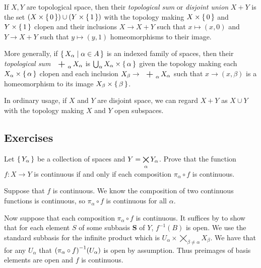 \documentclass[letterpaper, 11pt, oneside]{book}
\begin{document}
\clearpage

\begin{defn}
  If $X, Y$ are topological space, then their \emph{topological sum} or \emph{disjoint union} $X + Y$ is the set $(X \times \set{0}) \cup (Y \times \set{1})$ with the topology making $X \times \set{0}$ and $Y \times \set{1}$ clopen and their inclusions $X \to X + Y$ such that $x \mapsto (x, 0)$ and $Y \to X + Y$ such that $y \mapsto (y, 1)$ homeomorphisms to their image.

  More generally, if $\set{X_{\alpha} | \alpha \in A}$ is an indexed family of spaces, then their \emph{topological sum} $\bigplus_{\alpha} X_{\alpha}$ is $\bigcup_{\alpha} X_{\alpha} \times \set{\alpha}$ given the topology making each $X_{\alpha} \times \set{\alpha}$ clopen and each inclusion $X_{\beta} \to \bigplus_{\alpha} X_{\alpha}$ such that $x \to (x, \beta)$ is a homeomorphism to its image $X_{\beta} \times \set{\beta}$.
\end{defn}

In ordinary usage, if $X$ and $Y$ are disjoint space, we can regard $X + Y$ as $X \cup Y$ with the topology making $X$ and $Y$ open subspaces.

\clearpage

\subsection*{Exercises}

\begin{exercise}\label{exercise: Bredon 1.8.3}
  Let $\set{Y_{\alpha}}$ be a collection of spaces and $Y = \bigtimes\limits_{\alpha} Y_{\alpha}$.
  Prove that the function $f\colon X \to Y$ is continuous if and only if each composition $\pi_{\alpha} \circ f$ is continuous.
\end{exercise}
\begin{pf}
  Suppose that $f$ is continuous.
  We know the composition of two continuous functions is continuous, so $\pi_{\alpha} \circ f$ is continuous for all $\alpha$.

  Now suppose that each composition $\pi_{\alpha} \circ f$ is continuous.
  It suffices by  to show that for each element $S$ of some subbasis \textbf{S} of $Y$, $f^{-1}(B)$ is open.
  We use the standard subbasis for the infinite product which is $U_{\alpha} \times \bigtimes_{\beta \neq \alpha} X_{\beta}$.
  We have that for any $U_{\alpha}$ that $\pqty{\pi_{\alpha} \circ f}^{-1}(U_{\alpha})$ is open by assumption.
  Thus preimages of basis elements are open and $f$ is continuous.
\end{pf}
\end{document}
